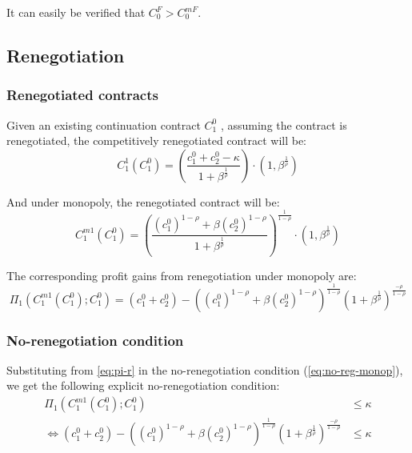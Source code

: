 \documentclass[11pt,english]{article}
\theoremstyle{plain}
\theoremstyle{definition}
\begin{document}
It can easily be verified that $C_{0}^{F}>C_{0}^{mF}$.

\subsection{Renegotiation }

\subsubsection{Renegotiated contracts}

Given an existing continuation contract $C_{1}^{0}$ , assuming the
contract is renegotiated, the competitively renegotiated contract
will be: 
\begin{equation}
C_{1}^{1}\left(C_{1}^{0}\right)=\left(\frac{c_{1}^{0}+c_{2}^{0}-\kappa}{1+\beta^{\frac{1}{\rho}}}\right)\cdot\left(1,\beta^{\frac{1}{\rho}}\right)\label{eq:c-r}
\end{equation}

And under monopoly, the renegotiated contract will be: 
\begin{equation}
C_{1}^{m1}\left(C_{1}^{0}\right)=\left(\frac{(c_{1}^{0})^{1-\rho}+\beta(c_{2}^{0})^{1-\rho}}{1+\beta^{\frac{1}{\rho}}}\right)^{\frac{1}{1-\rho}}\cdot\left(1,\beta^{\frac{1}{\rho}}\right)\label{eq:m-r}
\end{equation}

The corresponding profit gains from renegotiation under monopoly are:
\begin{equation}
\Pi_{1}\left(C_{1}^{m1}\left(C_{1}^{0}\right);C_{1}^{0}\right)=\left(c_{1}^{0}+c_{2}^{0}\right)-\left((c_{1}^{0})^{1-\rho}+\beta(c_{2}^{0})^{1-\rho}\right)^{\frac{1}{1-\rho}}\left(1+\beta^{\frac{1}{\rho}}\right)^{\frac{-\rho}{1-\rho}}\label{eq:pi-r}
\end{equation}

\subsubsection{No-renegotiation condition}

Substituting from \ref{eq:pi-r} in the no-renegotiation condition
(\ref{eq:no-reg-monop}), we get the following explicit no-renegotiation
condition: 
\begin{align}
\Pi_{1}\left(C_{1}^{m1}\left(C_{1}^{0}\right);C_{1}^{0}\right) & \le \kappa\nonumber \\
\Longleftrightarrow\left(c_{1}^{0}+c_{2}^{0}\right)-\left((c_{1}^{0})^{1-\rho}+\beta(c_{2}^{0})^{1-\rho}\right)^{\frac{1}{1-\rho}}\left(1+\beta^{\frac{1}{\rho}}\right)^{\frac{-\rho}{1-\rho}} & \leq\kappa\label{eq:no-renegotiation}
\end{align}
\end{document}
